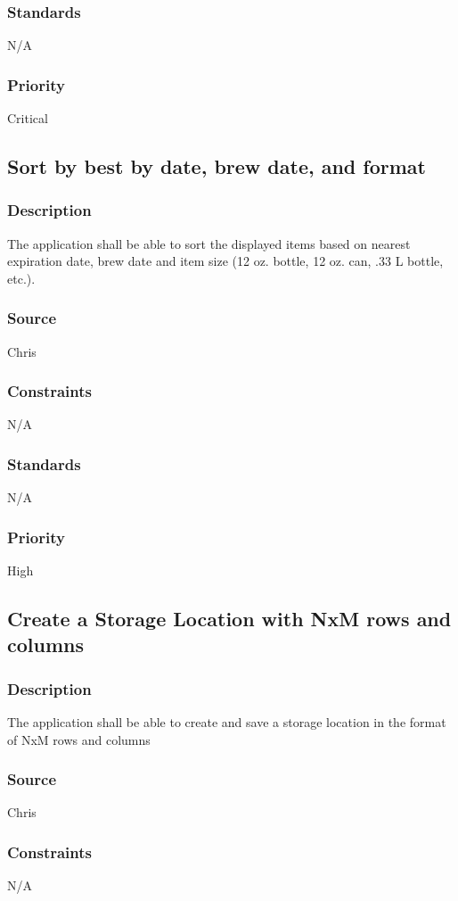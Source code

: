 \subsubsection{Standards}
N/A
\subsubsection{Priority}
Critical

\subsection{Sort by best by date, brew date, and format}
\subsubsection{Description}
The application shall be able to sort the displayed items based on nearest expiration date, brew date and item size (12 oz. bottle, 12 oz. can, .33 L bottle, etc.).
\subsubsection{Source}
Chris
\subsubsection{Constraints}
N/A
\subsubsection{Standards}
N/A
\subsubsection{Priority}
High

\subsection{Create a Storage Location with NxM rows and columns}
\subsubsection{Description}
The application shall be able to create and save a storage location in the format of NxM rows and columns 
\subsubsection{Source}
Chris
\subsubsection{Constraints}
N/A
